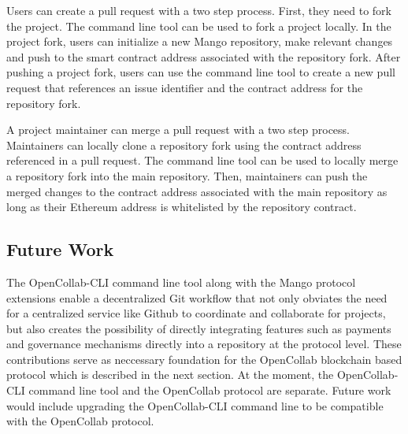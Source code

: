 Users can create a pull request with a two step process. First, they need to
fork the project. The command line tool can be used to fork a project locally.
In the project fork, users can initialize a new Mango repository, make relevant
changes and push to the smart contract address associated with the repository fork.
After pushing a project fork, users can use the command line tool to create a
new pull request that references an issue identifier and the contract address
for the repository fork.

A project maintainer can merge a pull request with a two step process.
Maintainers can locally clone a repository fork using the contract address
referenced in a pull request. The command line tool can be used to locally merge
a repository fork into the main repository. Then, maintainers can push the
merged changes to the contract address associated with the main repository as
long as their Ethereum address is whitelisted by the repository contract.

\subsection{Future Work}

The OpenCollab-CLI command line tool along with the Mango protocol extensions
enable a decentralized Git workflow that not only obviates the need for a
centralized service like Github to coordinate and collaborate for projects, but
also creates the possibility of directly integrating features such as payments and
governance mechanisms directly into a repository at the protocol level. These
contributions serve as neccessary foundation for the OpenCollab blockchain based
protocol which is described in the next section. At the moment, the
OpenCollab-CLI command line tool and the OpenCollab protocol are separate.
Future work would include upgrading the OpenCollab-CLI command line to be
compatible with the OpenCollab protocol.

